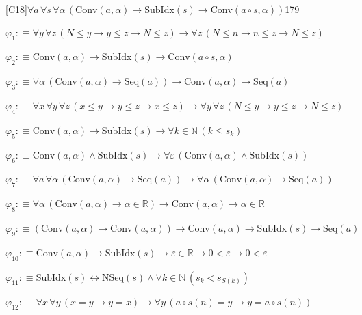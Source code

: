 \begin{fullproof}{[C18]}{$\forall a\,\forall s\,\forall \alpha\,(\mathrm{Conv}(a,\alpha) \to \mathrm{SubIdx}(s) \to \mathrm{Conv}(a \circ s,\alpha))$}{179}
\begin{ptree}
\noLine
{}
\end{ptree}
\begin{abbrevlist}
\item $\varphi_{1} :\equiv \forall y\,\forall z\,(N \leq y \to y \leq z \to N \leq z) \to \forall z\,(N \leq n \to n \leq z \to N \leq z)$
\item $\varphi_{2} :\equiv \mathrm{Conv}(a,\alpha) \to \mathrm{SubIdx}(s) \to \mathrm{Conv}(a \circ s,\alpha)$
\item $\varphi_{3} :\equiv \forall \alpha\,(\mathrm{Conv}(a,\alpha) \to \mathrm{Seq}(a)) \to \mathrm{Conv}(a,\alpha) \to \mathrm{Seq}(a)$
\item $\varphi_{4} :\equiv \forall x\,\forall y\,\forall z\,(x \leq y \to y \leq z \to x \leq z) \to \forall y\,\forall z\,(N \leq y \to y \leq z \to N \leq z)$
\item $\varphi_{5} :\equiv \mathrm{Conv}(a,\alpha) \to \mathrm{SubIdx}(s) \to \forall k \in \mathbb{N}\,(k \leq s_{k})$
\item $\varphi_{6} :\equiv \mathrm{Conv}(a,\alpha) \land \mathrm{SubIdx}(s) \to \forall \varepsilon\,(\mathrm{Conv}(a,\alpha) \land \mathrm{SubIdx}(s))$
\item $\varphi_{7} :\equiv \forall a\,\forall \alpha\,(\mathrm{Conv}(a,\alpha) \to \mathrm{Seq}(a)) \to \forall \alpha\,(\mathrm{Conv}(a,\alpha) \to \mathrm{Seq}(a))$
\item $\varphi_{8} :\equiv \forall \alpha\,(\mathrm{Conv}(a,\alpha) \to \alpha \in \mathbb{R}) \to \mathrm{Conv}(a,\alpha) \to \alpha \in \mathbb{R}$
\item $\varphi_{9} :\equiv (\mathrm{Conv}(a,\alpha) \to \mathrm{Conv}(a,\alpha)) \to \mathrm{Conv}(a,\alpha) \to \mathrm{SubIdx}(s) \to \mathrm{Seq}(a)$
\item $\varphi_{10} :\equiv \mathrm{Conv}(a,\alpha) \to \mathrm{SubIdx}(s) \to \varepsilon \in \mathbb{R} \to 0 < \varepsilon \to 0 < \varepsilon$
\item $\varphi_{11} :\equiv \mathrm{SubIdx}(s) \leftrightarrow \mathrm{NSeq}(s) \land \forall k \in \mathbb{N}\,(s_{k} < s_{S(k)})$
\item $\varphi_{12} :\equiv \forall x\,\forall y\,(x = y \to y = x) \to \forall y\,(a \circ s(n) = y \to y = a \circ s(n))$

\end{abbrevlist}
\end{fullproof}
